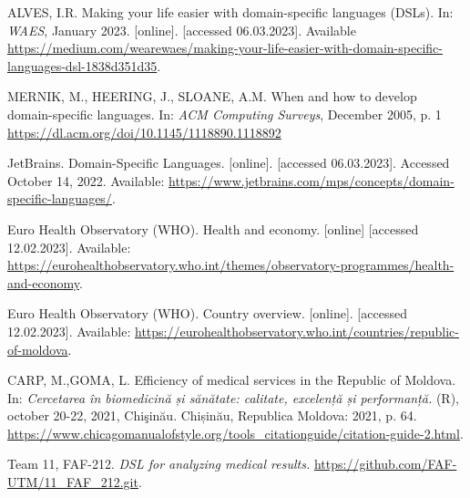 \begin{thebibliography}{99}
\singlespace \normalsize


  ALVES, I.R. Making your life easier with domain-specific languages (DSLs).
  In: \emph{WAES}, January 2023.
  [online]. [accessed 06.03.2023]. Available
  \url{https://medium.com/wearewaes/making-your-life-easier-with-domain-specific-languages-dsl-1838d351d35}.

  MERNIK, M., HEERING, J., SLOANE, A.M. When and how to develop domain-specific languages.
  In: \emph{ACM Computing Surveys}, December 2005, p. 1
  \url{https://dl.acm.org/doi/10.1145/1118890.1118892}

  JetBrains. Domain-Specific Languages.
  [online]. [accessed 06.03.2023].
  Accessed October 14, 2022. Available:
  \url{https://www.jetbrains.com/mps/concepts/domain-specific-languages/}.

  Euro Health Observatory (WHO).
  Health and economy.
  [online] [accessed 12.02.2023]. Available:
  \url{https://eurohealthobservatory.who.int/themes/observatory-programmes/health-and-economy}.

  Euro Health Observatory (WHO).
  Country overview. 
  [online]. [accessed 12.02.2023]. Available:
  \url{https://eurohealthobservatory.who.int/countries/republic-of-moldova}.

  CARP, M.,GOMA, L. Efficiency of medical services in the Republic of Moldova.
  In: \emph{Cercetarea în biomedicină și sănătate: calitate, excelență și performanță. }
  (R), october 20-22, 2021, Chişinău. Chișinău, Republica Moldova: 2021, p. 64.
  \url{https://www.chicagomanualofstyle.org/tools_citationguide/citation-guide-2.html}.

  Team 11, FAF-212.
  \emph{DSL for analyzing medical results.}
  \url{https://github.com/FAF-UTM/11_FAF_212.git}. 
  


\end{thebibliography}
